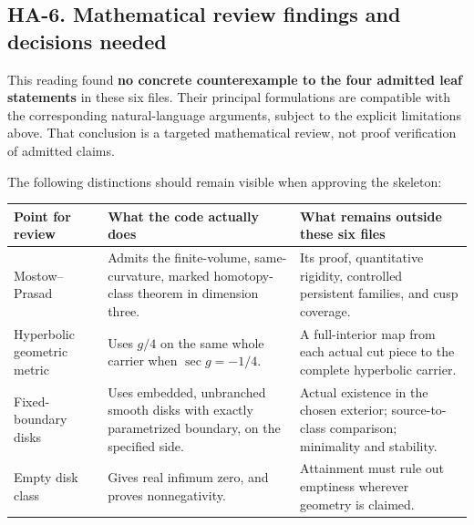 \documentclass[
  letterpaper,
  11pt]{article}
\begin{document}
\subsection{HA-6. Mathematical review findings and decisions
needed}\label{ha-6}

This reading found \textbf{no concrete counterexample to the four
admitted leaf statements} in these six files. Their principal
formulations are compatible with the corresponding natural-language
arguments, subject to the explicit limitations above. That conclusion is
a targeted mathematical review, not proof verification of admitted
claims.

The following distinctions should remain visible when approving the
skeleton:

\begin{longtable}[]{@{}
  >{\raggedright\arraybackslash}p{}
  >{\raggedright\arraybackslash}p{}
  >{\raggedright\arraybackslash}p{}@{}}
\toprule\noalign{}
\begin{minipage}[b]{\linewidth}\raggedright
Point for review
\end{minipage} & \begin{minipage}[b]{\linewidth}\raggedright
What the code actually does
\end{minipage} & \begin{minipage}[b]{\linewidth}\raggedright
What remains outside these six files
\end{minipage} \\
\midrule\noalign{}
\endhead
\bottomrule\noalign{}
\endlastfoot
Mostow--Prasad & Admits the finite-volume, same-curvature, marked
homotopy-class theorem in dimension three. & Its proof, quantitative
rigidity, controlled persistent families, and cusp coverage. \\
Hyperbolic geometric metric & Uses \(g/4\) on the same whole carrier
when \(\sec g=-1/4\). & A full-interior map from each actual cut piece
to the complete hyperbolic carrier. \\
Fixed-boundary disks & Uses embedded, unbranched smooth disks with
exactly parametrized boundary, on the specified side. & Actual existence
in the chosen exterior; source-to-class comparison; minimality and
stability. \\
Empty disk class & Gives real infimum zero, and proves nonnegativity. &
Attainment must rule out emptiness wherever geometry is claimed. \\

\end{longtable}
\end{document}
